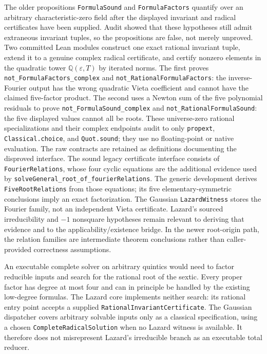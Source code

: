 \documentclass[11pt,a4paper,oneside]{article}
\newcommand{\lean}[1]{\nolinkurl{#1}}
\newcommand{\Q}{\mathbb{Q}}
\newcommand{\eps}{\varepsilon}
\begin{document}
The older propositions \lean{FormulaSound} and \lean{FormulaFactors} quantify
over an arbitrary characteristic-zero field after the displayed invariant and
radical certificates have been supplied.  Audit showed that these hypotheses
still admit extraneous invariant tuples, so the propositions are false, not
merely unproved.  Two committed Lean modules construct one exact rational
invariant tuple, extend it to a genuine complex radical certificate, and
certify nonzero elements in the quadratic tower $\Q(\eps,T)$ by iterated
norms.  The first proves \lean{not_FormulaFactors_complex} and
\lean{not_RationalFormulaFactors}: the inverse-Fourier output has the wrong
quadratic Vieta coefficient and cannot have the claimed five-factor product.
The second uses a Newton sum of the five polynomial residuals to prove
\lean{not_FormulaSound_complex} and \lean{not_RationalFormulaSound}: the five
displayed values cannot all be roots.  These universe-zero rational
specializations and their complex endpoints audit to only \lean{propext},
\lean{Classical.choice}, and \lean{Quot.sound}; they use no floating-point or
native evaluation.  The raw contracts are retained as definitions documenting
the disproved interface.  The sound
legacy certificate interface consists of \lean{FourierRelations}, whose four cyclic
equations are the additional evidence used by
\lean{solveGeneral_root_of_fourierRelations}.  The generic development derives
\lean{FiveRootRelations} from those equations; its five
elementary-symmetric conclusions imply an exact factorization.  The Gaussian
\lean{LazardWitness} stores the Fourier family, not an independent Vieta
certificate.  Lazard's
sourced irreducibility and $-1$ nonsquare hypotheses remain relevant to
deriving that evidence and to the applicability/existence bridge.  In the
newer root-origin path, the relation families are intermediate theorem
conclusions rather than caller-provided correctness assumptions.

An executable complete solver on arbitrary quintics would need to factor
reducible inputs and search for the rational root of the sextic.  Every proper
factor has degree at most four and can in principle be handled by the existing
low-degree formulas.  The Lazard core implements neither search: its rational
entry point accepts a supplied \lean{RationalInvariantCertificate}.  The
Gaussian dispatcher covers arbitrary solvable inputs only as a classical
specification, using a chosen \lean{CompleteRadicalSolution} when no Lazard
witness is available.  It therefore does not misrepresent Lazard's
irreducible branch as an executable total reducer.
\end{document}
